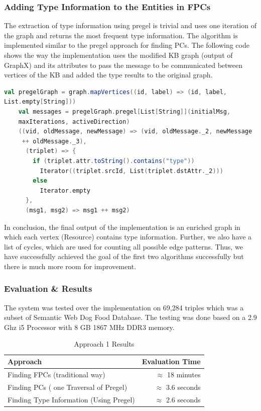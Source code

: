 \documentclass{easychair}
\begin{document}
\subsubsection{Adding Type Information to the Entities in FPCs}

The extraction of type information using pregel is trivial and uses one iteration of the graph and returns the most frequent  type information. The algorithm is implemented similar to the pregel approach for finding PCs.
The following code shows  the way the implementation uses the modified KB graph (output of GraphX) and its attributes to pass the message to be communicated between vertices of the KB and added the type results to the original graph.



\begin{lstlisting}[language=Scala]
val pregelGraph = graph.mapVertices((id, label) => (id, label, 
List.empty[String]))
    val messages = pregelGraph.pregel[List[String]](initialMsg, 
    maxIterations, activeDirection)
    ((vid, oldMessage, newMessage) => (vid, oldMessage._2, newMessage 
     ++ oldMessage._3),
      (triplet) => {
        if (triplet.attr.toString().contains("type"))
          Iterator((triplet.srcId, List(triplet.dstAttr._2)))
        else
          Iterator.empty
      },
      (msg1, msg2) => msg1 ++ msg2)

\end{lstlisting}

In conclusion, the final output of the implementation is an enriched graph in  which each vertex (Resource) contains type information. Further, we also have a list of cycles, which are used for counting all possible edge patterns. Thus, we have successfully achieved the goal of the first two algorithms successfully but there is much more room for improvement. 


\subsubsection{Evaluation \& Results}
The system was tested over the implementation on 69,284 triples which was a subset of Semantic Web Dog Food Database.  The testing was done based on a 2.9 Ghz i5 Processor with 8 GB 1867 MHz DDR3 memory. 

\begin{table}[htp]
	\begin{centering}
		\begin{tabular}{lr}
		\hline
	    Approach            & Evaluation Time \\
		\hline
		Finding FPCs (traditional way)      &  $\approx$ 18 minutes  \\
		 Finding PCs ( one Traversal of Pregel)  &  $\approx$ 3.6 seconds  \\
	      Finding Type Information (Using Pregel)    &  $\approx$ 2.6 seconds  \\
		\hline
		\end{tabular}
		\caption{Approach 1 Results}
		\label{tab:ltbexample}
	\end{centering}
\end{table}
\end{document}
